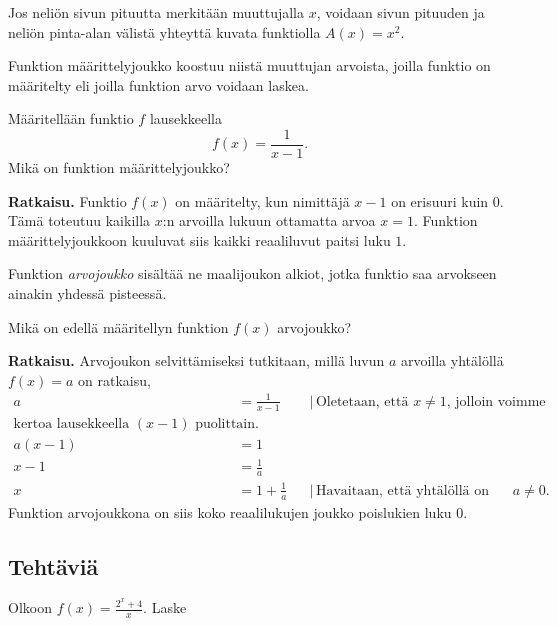 \begin{esimerkki}
Jos neliön sivun pituutta merkitään muuttujalla $x$, voidaan sivun pituuden
ja neliön pinta-alan välistä yhteyttä kuvata funktiolla
$A(x) = x^2$.
\end{esimerkki}

Funktion määrittelyjoukko koostuu niistä muuttujan arvoista, joilla
funktio on määritelty eli joilla funktion arvo voidaan laskea.

\begin{esimerkki}
Määritellään funktio $f$ lausekkeella
\[
f(x) = \frac{1}{x-1}.
\]
Mikä on funktion määrittelyjoukko?

\textbf{Ratkaisu.}
Funktio $f(x)$ on määritelty, kun nimittäjä $x-1$ on erisuuri
kuin 0. Tämä toteutuu kaikilla $x$:n arvoilla lukuun ottamatta
arvoa $x = 1$. Funktion määrittelyjoukkoon kuuluvat siis
kaikki reaaliluvut paitsi luku $1$.
\end{esimerkki}

Funktion \emph{arvojoukko} sisältää ne maalijoukon alkiot,
jotka funktio saa arvokseen ainakin yhdessä pisteessä.

\begin{esimerkki}
Mikä on edellä määritellyn funktion $f(x)$ arvojoukko?

\textbf{Ratkaisu.}%
Arvojoukon selvittämiseksi tutkitaan, millä luvun $a$ arvoilla
yhtälöllä $f(x) = a$ on ratkaisu,
\begin{align*}
a &= \frac{1}{x-1} & &| \, \text{Oletetaan, että $x \neq 1$, jolloin voimme} \\ \text{kertoa lausekkeella $(x-1)$ puolittain.} \\
a(x-1) &= 1 \\
x-1 &= \frac{1}{a} \\
x &= 1+\frac{1}{a} & &| \, \text{Havaitaan, että yhtälöllä on ratkaisu
kaikilla $a \neq 0$.}
\end{align*}
Funktion arvojoukkona on siis koko reaalilukujen joukko poislukien luku $0$.
\end{esimerkki}


\subsection*{Tehtäviä}
\begin{tehtava}
Olkoon $f(x)=\frac{2^x+4}{x}$. Laske
\begin{alakohdat}
\end{alakohdat}
\begin{vastaus}
\begin{alakohdat}
\end{alakohdat}
\end{vastaus}
\end{tehtava}

